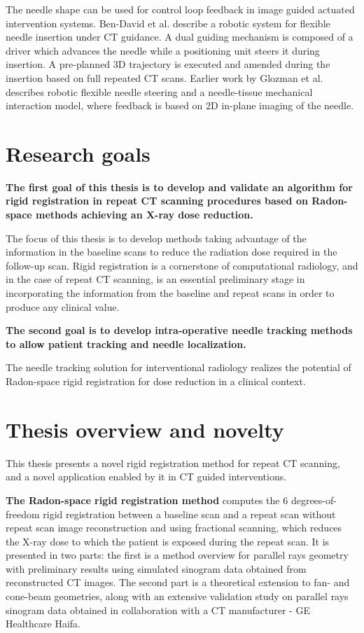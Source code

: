 The needle shape can be used for control loop feedback in image guided actuated intervention systems.
Ben-David et al. \cite{ben2018evaluation} describe a robotic system for flexible needle insertion under CT guidance. A dual guiding mechanism is composed of a driver which advances the needle while a positioning unit steers it during insertion. A pre-planned 3D trajectory is executed and amended during the insertion based on full repeated CT scans. Earlier work by Glozman et al. \cite{glozman2007image} describes robotic flexible needle steering and a needle-tissue mechanical interaction model, where feedback is based on 2D in-plane imaging of the needle.

\section{Research goals}

\textbf{The first goal of this thesis is to develop and validate an algorithm for rigid registration in repeat CT scanning procedures based on Radon-space methods achieving an X-ray dose reduction.}

The focus of this thesis is to develop methods taking advantage of the information in the baseline scans to reduce the radiation dose required in the follow-up scan. Rigid registration is a cornerstone of computational radiology, and in the case of repeat CT scanning, is an essential preliminary stage in incorporating the information from the baseline and repeat scans in order to produce any clinical value.

\textbf{The second goal is to develop intra-operative needle tracking methods to allow patient tracking and needle localization.}

The needle tracking solution for interventional radiology realizes the potential of Radon-space rigid registration for dose reduction in a clinical context.

\section{Thesis overview and novelty}

This thesis presents a novel rigid registration method for repeat CT scanning, and a novel application enabled by it in CT guided interventions.

\textbf{The Radon-space rigid registration method} computes the 6 degrees-of-freedom rigid registration between a baseline scan and a repeat scan without repeat scan image reconstruction and using fractional scanning, which reduces the X-ray dose to which the patient is exposed during the repeat scan.
It is presented in two parts: the first is a method overview for parallel rays geometry with preliminary results using simulated sinogram data obtained from reconstructed CT images. The second part is a theoretical extension to fan- and cone-beam geometries, along with an extensive validation study on parallel rays sinogram data obtained in collaboration with a CT manufacturer - GE Healthcare Haifa.
 
